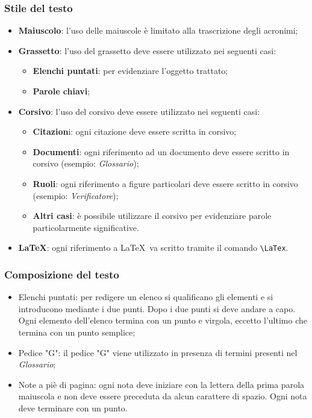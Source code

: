 \subsubsection{Stile del testo}
\begin{itemize}
	\item \textbf{Maiuscolo}: l'uso delle maiuscole è limitato alla trascrizione degli acronimi;
	\item \textbf{Grassetto}: l'uso del grassetto deve essere utilizzato nei seguenti casi: 
	\begin{itemize}
		\item \textbf{Elenchi puntati}: per evidenziare l'oggetto trattato;
		\item \textbf{Parole chiavi};
	\end{itemize}
	\item \textbf{Corsivo}: l'uso del corsivo deve essere utilizzato nei seguenti casi:
	\begin{itemize}
		\item \textbf{Citazion}i: ogni citazione deve essere scritta in corsivo; 
		\item \textbf{Documenti}: ogni riferimento ad un documento deve essere scritto in corsivo (esempio: \textit{Glossario});
		\item \textbf{Ruoli}: ogni riferimento a figure particolari deve essere scritto in corsivo (esempio: \textit{Verificatore});
		\item \textbf{Altri casi}: è possibile utilizzare il corsivo per evidenziare parole particolarmente significative.
	\end{itemize}
	\item \textbf{\LaTeX}: ogni riferimento a \LaTeX\ va scritto tramite il comando \verb|\LaTex|.
\end{itemize}

\subsubsection{Composizione del testo}
\begin{itemize}
	\item Elenchi puntati: per redigere un elenco si qualificano gli elementi e si introducono mediante
	i due punti. Dopo i due punti si deve andare a capo. Ogni elemento dell'elenco termina con un punto e virgola, eccetto l'ultimo che termina con un punto semplice;
	\item Pedice "G": il pedice "G" viene utilizzato in presenza di termini presenti nel \textit{Glossario};
	\item Note a piè di pagina: ogni nota deve iniziare con la lettera della prima parola maiuscola e non deve essere preceduta da alcun carattere di spazio. Ogni nota deve terminare con un punto.
\end{itemize}

